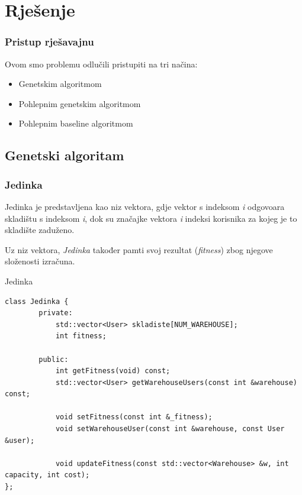 \documentclass[utf8]{beamer}
\begin{document}
\section{Rješenje}
\begin{frame}
\frametitle{Pristup rješavajnu}

Ovom smo problemu odlučili pristupiti na tri načina:
\vspace{5mm}
\begin{itemize}
  \item Genetskim algoritmom
  \vspace{5mm}
  \item Pohlepnim genetskim algoritmom
  \vspace{5mm}
  \item Pohlepnim baseline algoritmom
\end{itemize}

\end{frame}

\subsection{Genetski algoritam}
\begin{frame}
\frametitle{Jedinka}
Jedinka je predstavljena kao niz vektora, gdje vektor s indeksom \textit{i} odgovoara skladištu s indeksom \textit{i}, dok su značajke vektora \textit{i} indeksi korisnika za kojeg je to skladište zaduženo.

\vspace{5mm}

Uz niz vektora, \textit{Jedinka} također pamti svoj rezultat (\textit{fitness}) zbog njegove složenosti izračuna.

\end{frame}

\begin{frame}[fragile]{Jedinka}
\begin{lstlisting}
class Jedinka {
        private:
            std::vector<User> skladiste[NUM_WAREHOUSE];
            int fitness;

        public:
            int getFitness(void) const;
            std::vector<User> getWarehouseUsers(const int &warehouse) const;

            void setFitness(const int &_fitness);
            void setWarehouseUser(const int &warehouse, const User &user);

            void updateFitness(const std::vector<Warehouse> &w, int capacity, int cost);
};
\end{lstlisting}
\end{frame}
\end{document}
